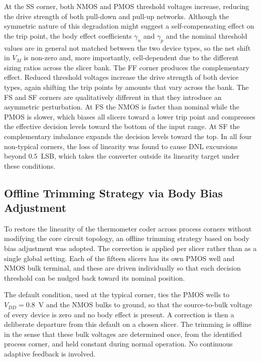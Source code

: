 At the SS corner, both NMOS and PMOS threshold voltages increase, reducing the
drive strength of both pull-down and pull-up networks. Although the symmetric
nature of this degradation might suggest a self-compensating effect on the
trip point, the body effect coefficients $\gamma_n$ and $\gamma_p$ and the
nominal threshold values are in general not matched between the two device
types, so the net shift in $V_M$ is non-zero and, more importantly,
cell-dependent due to the different sizing ratios across the slicer bank. The
FF corner produces the complementary effect. Reduced threshold voltages
increase the drive strength of both device types, again shifting the trip
points by amounts that vary across the bank. The FS and SF corners are
qualitatively different in that they introduce an asymmetric perturbation.
At FS the NMOS is faster than nominal while the PMOS is slower, which biases
all slicers toward a lower trip point and compresses the effective decision
levels toward the bottom of the input range. At SF the complementary imbalance
expands the decision levels toward the top. In all four non-typical corners,
the loss of linearity was found to cause DNL excursions beyond $0.5$~LSB,
which takes the converter outside its linearity target under these conditions.

\subsection{Offline Trimming Strategy via Body Bias Adjustment}
\label{sec:offline_strategy}

To restore the linearity of the thermometer coder across process corners
without modifying the core circuit topology, an offline trimming strategy
based on body bias adjustment was adopted. The correction is applied per
slicer rather than as a single global setting. Each of the fifteen slicers has
its own PMOS well and NMOS bulk terminal, and these are driven individually so
that each decision threshold can be nudged back toward its nominal position.

The default condition, used at the typical corner, ties the PMOS wells to
$V_{DD}=0.8$~V and the NMOS bulks to ground, so that the source-to-bulk voltage
of every device is zero and no body effect is present. A correction is then a
deliberate departure from this default on a chosen slicer. The trimming is offline in the sense that these
bulk voltages are determined once, from the identified process corner, and held
constant during normal operation. No continuous adaptive feedback is involved.

